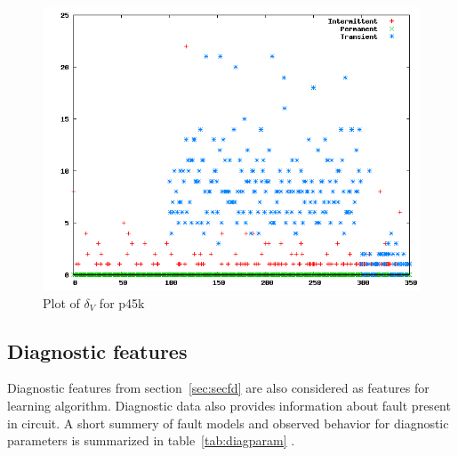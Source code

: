 \begin{figure}[h]
  \begin{center}
    \captionsetup{justification=centering}
    \includegraphics[scale=0.35]{figures/deltavp45k.png}
    \caption{Plot of $\delta_V$ for p45k}
    \label{fig:deltavp45k}
  \end{center}
\end{figure}

\subsection{Diagnostic features}
Diagnostic features from section~\ref{sec:secfd} are also considered as features for learning algorithm. Diagnostic data also provides information about fault present in circuit. A short summery of fault models and observed behavior for diagnostic parameters is summarized in table~\ref{tab:diagparam} \cite{Holst2009}.

